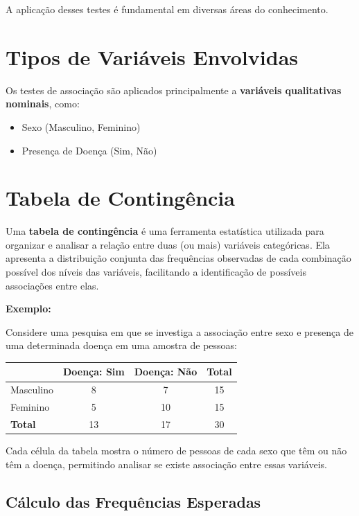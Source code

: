 \documentclass[
]{book}
\newcounter{none} %
\providecommand{\tightlist}{%
  \setlength{\itemsep}{0pt}\setlength{\parskip}{0pt}}
\begin{document}
A aplicação desses testes é fundamental em diversas áreas do conhecimento.

\section{Tipos de Variáveis Envolvidas}\label{tipos-de-variuxe1veis-envolvidas}

Os testes de associação são aplicados principalmente a \textbf{variáveis qualitativas nominais}, como:

\begin{itemize}
\tightlist
\item
  Sexo (Masculino, Feminino)
\item
  Presença de Doença (Sim, Não)
\end{itemize}

\section{Tabela de Contingência}\label{tabela-de-continguxeancia}

Uma \textbf{tabela de contingência} é uma ferramenta estatística utilizada para organizar e analisar a relação entre duas (ou mais) variáveis categóricas. Ela apresenta a distribuição conjunta das frequências observadas de cada combinação possível dos níveis das variáveis, facilitando a identificação de possíveis associações entre elas.

\textbf{Exemplo:}

Considere uma pesquisa em que se investiga a associação entre sexo e presença de uma determinada doença em uma amostra de pessoas:

{\def\LTcaptype{none} %
\begin{longtable}[]{@{}lccc@{}}
\toprule\noalign{}
& Doença: Sim & Doença: Não & Total \\
\midrule\noalign{}
\endhead
\bottomrule\noalign{}
\endlastfoot
Masculino & 8 & 7 & 15 \\
Feminino & 5 & 10 & 15 \\
\textbf{Total} & 13 & 17 & 30 \\
\end{longtable}
}

Cada célula da tabela mostra o número de pessoas de cada sexo que têm ou não têm a doença, permitindo analisar se existe associação entre essas variáveis.

\subsection{Cálculo das Frequências Esperadas}\label{cuxe1lculo-das-frequuxeancias-esperadas}
\end{document}
